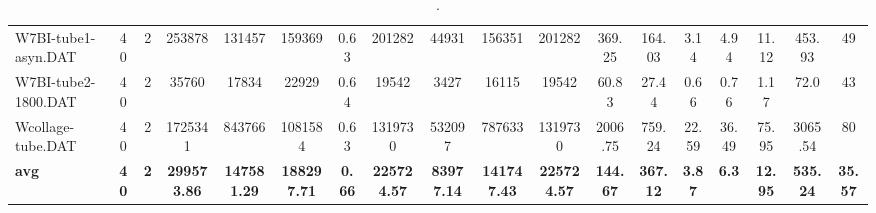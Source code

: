 \begin{sidewaystable}[h]
{\begin{tabular}{lccccccccccccccccc}
W7BI-tube1-asyn.DAT & 40 & 2 & 253878 & 131457 & 159369 & 0.63 & 201282 & 44931 & 156351 & 201282 & 369.25 & 164.03 & 3.14 & 4.94 & 11.12 & 453.93 & 49\\
W7BI-tube2-1800.DAT & 40 & 2 & 35760 & 17834 & 22929 & 0.64 & 19542 & 3427 & 16115 & 19542 & 60.83 & 27.44 & 0.66 & 0.76 & 1.17 & 72.0 & 43\\
Wcollage-tube.DAT & 40 & 2 & 1725341 & 843766 & 1081584 & 0.63 & 1319730 & 532097 & 787633 & 1319730 & 2006.75 & 759.24 & 22.59 & 36.49 & 75.95 & 3065.54 & 80\\
\cline{1-18} \textbf{avg} & \textbf{40} & \textbf{2} & \textbf{299573.86} & \textbf{147581.29} & \textbf{188297.71} & \textbf{0.66} & \textbf{225724.57} & \textbf{83977.14} & \textbf{141747.43} & \textbf{225724.57} & \textbf{144.67} & \textbf{367.12} & \textbf{3.87} & \textbf{6.3} & \textbf{12.95} & \textbf{535.24} & \textbf{35.57} \\ \cline{1-18}
\bottomrule
\end{tabular}%
}%
\caption{.}
\label{tab:table_bc}
\end{sidewaystable}

